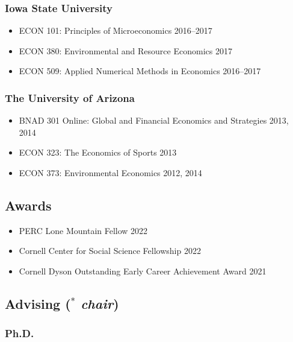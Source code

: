 \documentclass[11pt]{res} %
\begin{document}
\begin{resume}
\subsubsection{Iowa State University}
\begin{itemize} \itemsep -1pt
	\item[] ECON 101: Principles of Microeconomics \hfill 2016--2017
	\item[] ECON 380: Environmental and Resource Economics \hfill 2017
	\item[] ECON 509: Applied Numerical Methods in Economics \hfill 2016--2017
\end{itemize}\vspace{-.3in}
\subsubsection{The University of Arizona}
\begin{itemize} \itemsep -1pt %
	\item[] BNAD 301 Online: Global and Financial Economics and Strategies \hfill 2013, 2014
	\item[] ECON 323: The Economics of Sports \hfill 2013
	\item[] ECON 373: Environmental Economics \hfill 2012, 2014
\end{itemize}

\vspace{-.2in}

\subsection{Awards}
\begin{itemize}
	\item[] PERC Lone Mountain Fellow \hfill 2022
	\item[] Cornell Center for Social Science Fellowship \hfill 2022
	\item[] Cornell Dyson Outstanding Early Career Achievement Award \hfill 2021
\end{itemize}

\vspace{-.2in}

\subsection{Advising ($^*$ \textit{chair})  }
\vspace{-.2in}

\subsubsection{Ph.D.}\vspace{-.2in}

\end{resume}
\end{document}
